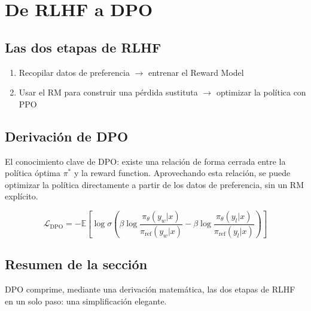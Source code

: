 \section{De RLHF a DPO}
\subsection{Las dos etapas de RLHF}
\begin{enumerate}
  \item Recopilar datos de preferencia $\to$ entrenar el Reward Model
  \item Usar el RM para construir una pérdida sustituta $\to$ optimizar la política con PPO
\end{enumerate}

\subsection{Derivación de DPO}
El conocimiento clave de DPO: existe una relación de forma cerrada entre la política óptima $\pi^*$ y la reward function. Aprovechando esta relación, se puede optimizar la política directamente a partir de los datos de preferencia, sin un RM explícito.

$$\mathcal{L}_{\text{DPO}} = -\mathbb{E}\left[\log \sigma\left(\beta \log \frac{\pi_\theta(y_w|x)}{\pi_{\text{ref}}(y_w|x)} - \beta \log \frac{\pi_\theta(y_l|x)}{\pi_{\text{ref}}(y_l|x)}\right)\right]$$

\subsection{Resumen de la sección}
DPO comprime, mediante una derivación matemática, las dos etapas de RLHF en un solo paso: una simplificación elegante.

\newpage
